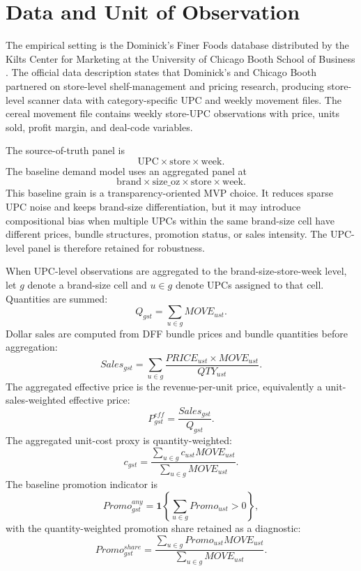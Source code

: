 \documentclass[11pt]{article}
\begin{document}
\section{Data and Unit of Observation}

The empirical setting is the Dominick's Finer Foods database distributed by the Kilts Center for Marketing at the University of Chicago Booth School of Business \citep{kilts_dominicks}. The official data description states that Dominick's and Chicago Booth partnered on store-level shelf-management and pricing research, producing store-level scanner data with category-specific UPC and weekly movement files. The cereal movement file contains weekly store-UPC observations with price, units sold, profit margin, and deal-code variables.

The source-of-truth panel is
\[
\text{UPC} \times \text{store} \times \text{week}.
\]
The baseline demand model uses an aggregated panel at
\[
\text{brand} \times \text{size\_oz} \times \text{store} \times \text{week}.
\]
This baseline grain is a transparency-oriented MVP choice. It reduces sparse UPC noise and keeps brand-size differentiation, but it may introduce compositional bias when multiple UPCs within the same brand-size cell have different prices, bundle structures, promotion status, or sales intensity. The UPC-level panel is therefore retained for robustness.

When UPC-level observations are aggregated to the brand-size-store-week level, let $g$ denote a brand-size cell and $u\in g$ denote UPCs assigned to that cell. Quantities are summed:
\begin{equation}
Q_{gst}=\sum_{u\in g} MOVE_{ust}.
\end{equation}
Dollar sales are computed from DFF bundle prices and bundle quantities before aggregation:
\begin{equation}
Sales_{gst}=\sum_{u\in g}\frac{PRICE_{ust}\times MOVE_{ust}}{QTY_{ust}}.
\end{equation}
The aggregated effective price is the revenue-per-unit price, equivalently a unit-sales-weighted effective price:
\begin{equation}
P^{eff}_{gst}=\frac{Sales_{gst}}{Q_{gst}}.
\end{equation}
The aggregated unit-cost proxy is quantity-weighted:
\begin{equation}
c_{gst}=
\frac{\sum_{u\in g} c_{ust} MOVE_{ust}}
{\sum_{u\in g} MOVE_{ust}}.
\end{equation}
The baseline promotion indicator is
\begin{equation}
Promo^{any}_{gst}=\mathbf{1}\left\{\sum_{u\in g} Promo_{ust}>0\right\},
\end{equation}
with the quantity-weighted promotion share retained as a diagnostic:
\begin{equation}
Promo^{share}_{gst}
=
\frac{\sum_{u\in g} Promo_{ust}MOVE_{ust}}
{\sum_{u\in g} MOVE_{ust}}.
\end{equation}
\end{document}
